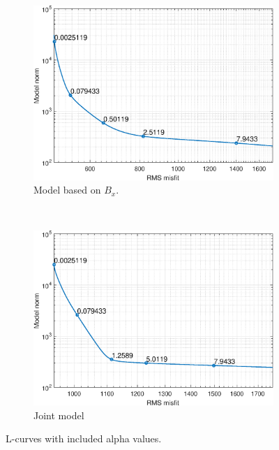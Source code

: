 \begin{figure}[ht]
    ~ %
    \begin{subfigure}[b]{0.45\textwidth}
        \includegraphics[width=\textwidth]{fig/LCurveBx.eps}
        \caption{Model based on $B_x$.}
        \label{fig:LCurveBx}
    \end{subfigure}
    ~ %
    \begin{subfigure}[b]{0.45\textwidth}
        \includegraphics[width=\textwidth]{fig/LCurveBj.eps}
        \caption{Joint model}
        \label{fig:LCurveBj}
    \end{subfigure}
    \caption{L-curves with included alpha values.}
    \label{fig:LCurve}
\end{figure}

